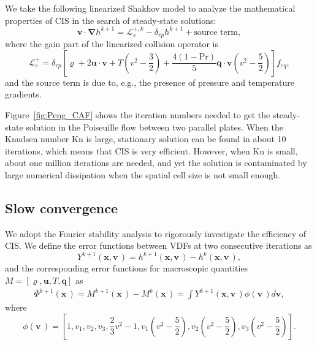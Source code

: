 We take the following linearized Shakhov model  to analyze the mathematical properties of CIS in the search of steady-state solutions:
\begin{equation}\label{bgkfd}
\bm{v} \cdot \bm \nabla {h^{k+1}} =\mathcal{L}_s^{+,k}- \delta_{rp}  h^{k+1}+\text{source term}, 
\end{equation}
where the gain part of the linearized collision operator is
\begin{equation}\label{LBE_Shakhov}
	\mathcal{L}^+_{s}=\delta_{rp}\left[\varrho+2\bm{u}\cdot\bm{v}+T\left(v^2-\frac{3}{2}\right)+\frac{4(1-\text{Pr})}{5}\bm{q}\cdot{\bm{v}}\left(v^2-\frac{5}{2}\right)\right]f_{eq},
\end{equation} 
and the source term is due to, e.g., the presence of pressure and temperature gradients.


Figure~\ref{fig:Peng_CAF} shows the iteration numbers needed to get the steady-state solution in the Poiseuille flow between two parallel plates. When the Knudsen number $\text{Kn}$ is large, stationary solution can be found in about 10 iterations, which means that CIS is very efficient. However, when $\text{Kn}$ is small, about one million iterations are needed, and yet the solution is contaminated by large numerical dissipation when the spatial cell size is not small enough.  



\subsection{Slow convergence}

We adopt the Fourier stability analysis  to rigorously investigate the efficiency of CIS. We define the error functions between VDFs at two consecutive iterations as
\begin{equation}\label{Diff_Y}
Y^{k+1}(\bm{x},\bm{v}\,)=h^{k+1}(\bm{x},\bm{v}\,)-h^{k}(\bm{x},\bm{v}\,), %
\end{equation}
and the corresponding error functions for macroscopic quantities $M=[\varrho,\bm{u}, T,\bm{q}]$ as 
\begin{equation}\label{Macro_difference}
\begin{aligned}
\Phi^{k+1}(\bm{x}\,)=M^{k+1}(\bm{x}\,)-M^{k}(\bm{x}\,)=\int{Y^{k+1}(\bm{x},\bm{v}\,)\phi(\bm{v}\,)}d\bm{v},
\end{aligned}
\end{equation}
where
\begin{equation}
\phi(\bm{v}\,)=\left[1,v_1,v_2,v_3,\frac{2}{3}v^2-1,v_1\left(v^2-\frac{5}{2}\right),v_2\left(v^2-\frac{5}{2}\right),
v_3\left(v^2-\frac{5}{2}\right)
\right].
\end{equation} 

